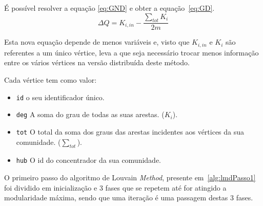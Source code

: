 É possível resolver a equação \ref{eq:GND} e obter a equação~\ref{eq:GD}.
\begin{equation}
	\Delta Q  =  K_{i,in} - \frac{\sum_{tot} K_i}{2m}
\label{eq:GD}
\end{equation}


Esta nova equação depende de menos variáveis e, visto que $K_{i,in}$ e $K_i$ são referentes a um único vértice, leva a que seja necessário trocar menos informação entre os vários vértices na versão distribuída deste método.

Cada vértice tem como valor:
\begin{itemize}
	\item \verb|id| o seu identificador único.
	\item \verb|deg| A soma do grau de todas as suas arestas. ($K_i$).
	\item \verb|tot| O total da soma dos graus das arestas incidentes aos vértices da sua comunidade. ($\sum_{tot}$).
	\item \verb|hub| O id do concentrador da sua comunidade.
\end{itemize}

O primeiro passo do algoritmo de Louvain \textit{Method}, presente em~\ref{alg:lmdPasso1} foi dividido em inicialização e 3 fases que se repetem até for atingido a modularidade máxima, sendo que uma iteração é uma passagem destas 3 fases.

